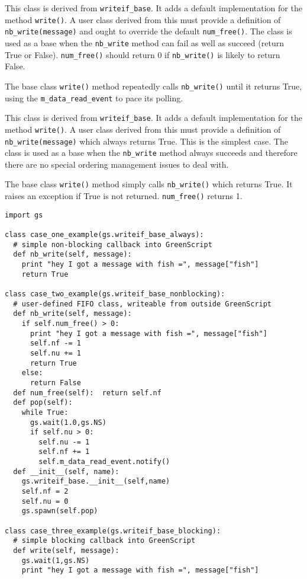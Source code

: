 \documentclass[12pt,oneside]{gsbook}
\begin{document}
 {This class is derived from
\texttt{writeif\_base}.  It adds a default implementation for the
method \texttt{write()}.  A user class derived from this must provide
a definition of \texttt{nb\_write(message)} and ought to override the
default \texttt{num\_free()}.  The class is used as a base when the
\texttt{nb\_write} method can fail as well as succeed (return True or
False).  \texttt{num\_free()} should return 0 if \texttt{nb\_write()}
is likely to return False.

The base class \texttt{write()} method repeatedly calls \texttt{nb\_write()}
until it returns True, using the \texttt{m\_data\_read\_event} to pace its
polling.
}

 {This class is derived from
\texttt{writeif\_base}.  It adds a default implementation for the
method \texttt{write()}.  A user class derived from this must provide
a definition of \texttt{nb\_write(message)} which always returns True.
This is the simplest case.  The class is used as a base when the
\texttt{nb\_write} method always succeeds and therefore there are
no special ordering management issues to deal with.

The base class \texttt{write()} method simply calls \texttt{nb\_write()}
which returns True.  It raises an exception if True is not
returned.  \texttt{num\_free()} returns 1.
}

\begin{lstlisting}
import gs

class case_one_example(gs.writeif_base_always):
  # simple non-blocking callback into GreenScript
  def nb_write(self, message):
    print "hey I got a message with fish =", message["fish"]
    return True

class case_two_example(gs.writeif_base_nonblocking):
  # user-defined FIFO class, writeable from outside GreenScript
  def nb_write(self, message):
    if self.num_free() > 0:
      print "hey I got a message with fish =", message["fish"]
      self.nf -= 1
      self.nu += 1
      return True
    else:
      return False
  def num_free(self):  return self.nf
  def pop(self):
    while True:
      gs.wait(1.0,gs.NS)
      if self.nu > 0:
        self.nu -= 1
        self.nf += 1
        self.m_data_read_event.notify()
  def __init__(self, name):
    gs.writeif_base.__init__(self,name)
    self.nf = 2
    self.nu = 0
    gs.spawn(self.pop)

class case_three_example(gs.writeif_base_blocking):
  # simple blocking callback into GreenScript
  def write(self, message):
    gs.wait(1,gs.NS)
    print "hey I got a message with fish =", message["fish"]

\end{lstlisting}
\end{document}
